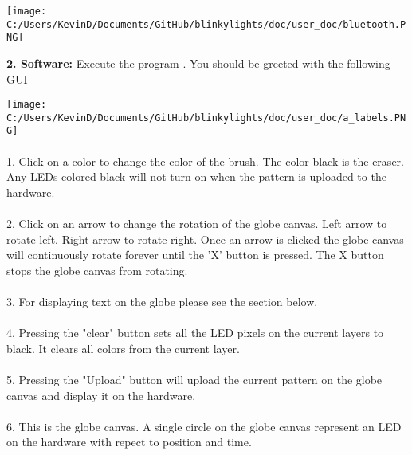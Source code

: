 \documentclass[12pt, a4paper]{ article}
\begin{document}
\indent

\texttt{[image: C:/Users/KevinD/Documents/GitHub/blinkylights/doc/user\_doc/bluetooth.PNG]}


\vspace{10cm}







\indent

\textbf{2. Software:} Execute the program . You should be greeted with the following GUI 

\indent

\texttt{[image: C:/Users/KevinD/Documents/GitHub/blinkylights/doc/user\_doc/a\_labels.PNG]}
\\\\
1. Click on a color to change the color of the brush. The color black is the eraser. Any LEDs colored black will not turn on when the pattern is uploaded to the hardware.
\\\\
2. Click on an arrow to change the rotation of the globe canvas. Left arrow to rotate left. Right arrow to rotate right. Once an arrow is clicked the globe canvas will continuously rotate forever until the 'X' button is pressed. The X button stops the globe canvas from rotating.
\\\\
3. For displaying text on the globe please see the section below.
\\\\
4. Pressing the "clear" button sets all the LED pixels on the current layers to black. It clears all colors from the current layer.
\\\\
5. Pressing the "Upload" button will upload the current pattern on the globe canvas and display it on the hardware.
\\\\
6. This is the globe canvas. A single circle on the globe canvas represent an LED on the hardware with repect to position and time.
\end{document}
